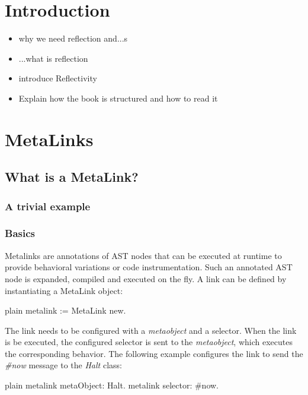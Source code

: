 \documentclass[10pt,twoside,english]{_support/latex/sbabook/sbabook}
\begin{document}
\frontmatter
\pagestyle{plain}

\tableofcontents*
\clearpage\listoffigures

\mainmatter

\chapter{Introduction}
\begin{itemize}
\item why we need reflection and...s
\item ...what is reflection
\item introduce Reflectivity
\item Explain how the book is structured and how to read it
\end{itemize}

\chapter{MetaLinks}\section{What is a MetaLink?}\subsection{A trivial example}\subsection{Basics}
Metalinks are annotations of AST nodes that can be executed at runtime to provide behavioral variations or code instrumentation. Such an annotated AST node is expanded, compiled and executed on the fly. A link can be defined by instantiating a MetaLink object:

\begin{displaycode}{plain}
metalink := MetaLink new.
\end{displaycode}

The link needs to be configured with a \textit{metaobject} and a selector. When the link is be executed, the configured selector is sent to the \textit{metaobject}, which executes the corresponding behavior. The following example configures the link to send the \textit{\#now} message to the \textit{Halt} class:

\begin{displaycode}{plain}
metalink metaObject: Halt.
metalink selector: #now.
\end{displaycode}
\end{document}
